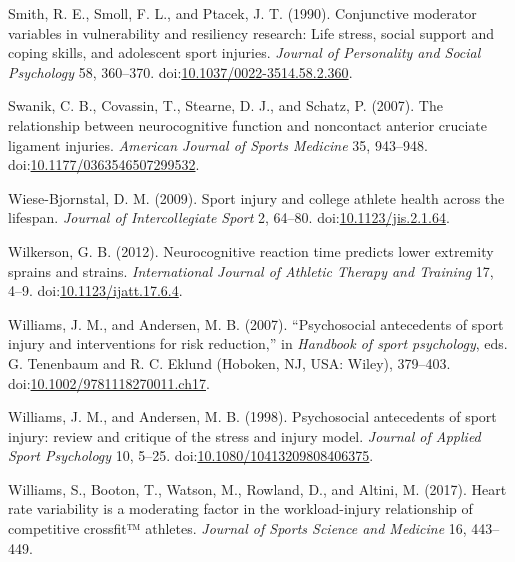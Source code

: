 \documentclass[utf8]{frontiersHLTH}
\begin{document}
\leavevmode\hypertarget{ref-Smith1990}{}%
Smith, R. E., Smoll, F. L., and Ptacek, J. T. (1990). Conjunctive
moderator variables in vulnerability and resiliency research: Life
stress, social support and coping skills, and adolescent sport injuries.
\emph{Journal of Personality and Social Psychology} 58, 360--370.
doi:\href{https://doi.org/10.1037/0022-3514.58.2.360}{10.1037/0022-3514.58.2.360}.

\leavevmode\hypertarget{ref-Swanik2007}{}%
Swanik, C. B., Covassin, T., Stearne, D. J., and Schatz, P. (2007). The
relationship between neurocognitive function and noncontact anterior
cruciate ligament injuries. \emph{American Journal of Sports Medicine}
35, 943--948.
doi:\href{https://doi.org/10.1177/0363546507299532}{10.1177/0363546507299532}.

\leavevmode\hypertarget{ref-Wiese-Bjornstal2009}{}%
Wiese-Bjornstal, D. M. (2009). Sport injury and college athlete health
across the lifespan. \emph{Journal of Intercollegiate Sport} 2, 64--80.
doi:\href{https://doi.org/10.1123/jis.2.1.64}{10.1123/jis.2.1.64}.

\leavevmode\hypertarget{ref-Wilkerson2012a}{}%
Wilkerson, G. B. (2012). Neurocognitive reaction time predicts lower
extremity sprains and strains. \emph{International Journal of Athletic
Therapy and Training} 17, 4--9.
doi:\href{https://doi.org/10.1123/ijatt.17.6.4}{10.1123/ijatt.17.6.4}.

\leavevmode\hypertarget{ref-Williams2007}{}%
Williams, J. M., and Andersen, M. B. (2007). ``Psychosocial antecedents
of sport injury and interventions for risk reduction,'' in
\emph{Handbook of sport psychology}, eds. G. Tenenbaum and R. C. Eklund
(Hoboken, NJ, USA: Wiley), 379--403.
doi:\href{https://doi.org/10.1002/9781118270011.ch17}{10.1002/9781118270011.ch17}.

\leavevmode\hypertarget{ref-Williams1998}{}%
Williams, J. M., and Andersen, M. B. (1998). Psychosocial antecedents of
sport injury: review and critique of the stress and injury model.
\emph{Journal of Applied Sport Psychology} 10, 5--25.
doi:\href{https://doi.org/10.1080/10413209808406375}{10.1080/10413209808406375}.

\leavevmode\hypertarget{ref-Williams2017}{}%
Williams, S., Booton, T., Watson, M., Rowland, D., and Altini, M.
(2017). Heart rate variability is a moderating factor in the
workload-injury relationship of competitive crossfit™ athletes.
\emph{Journal of Sports Science and Medicine} 16, 443--449.
\end{document}
